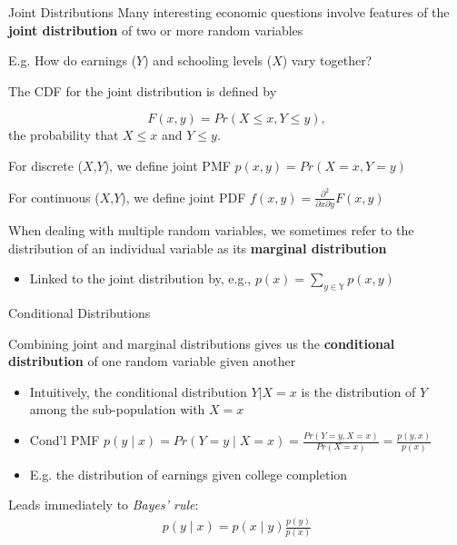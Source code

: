 \documentclass[11pt,english,handout]{beamer}
\newenvironment{wideitemize}{\itemize\addtolength{\itemsep}{10pt}}{\enditemize}
\begin{document}
\begin{frame}{Joint Distributions}
\vspace{0.2cm}
Many interesting economic questions involve features of the \textbf{joint distribution} of two or more random variables

\begin{wideitemize}
\item E.g. How do earnings ($Y$) and schooling levels ($X$) vary together?\pause{}

\item The CDF for the joint distribution is defined by
\vspace{-0.3cm}

$$F(x,y) = Pr(X \leq x, Y \leq y),$$
\noindent the probability that $X \leq x$ and $Y \leq y$.

\pause
\item For discrete ($X$,$Y$), we define joint PMF $p(x,y)=Pr(X=x,Y=y)$

\pause
\item For continuous ($X$,$Y$), we define joint PDF $f(x,y)=\frac{\partial^2}{\partial x \partial y}F(x,y)$
\end{wideitemize}
\vspace{0.5cm}
\pause{}

When dealing with multiple random variables, we sometimes refer to the distribution of an individual variable as its \textbf{marginal distribution}\pause{}

\begin{itemize}
\item Linked to the joint distribution by, e.g., $p(x)=\sum_{y\in\mathbb{Y}}p(x,y)$
\end{itemize}

\end{frame}

\begin{frame}{Conditional Distributions}

Combining joint and marginal distributions gives us the \textbf{conditional distribution} of one random variable given another

\begin{itemize}
\item Intuitively, the conditional distribution $Y|X=x$ is the distribution of $Y$ among the sub-population with $X=x$
	
\item Cond'l PMF $p(y\mid x)=Pr(Y=y\mid X=x)=\frac{Pr(Y=y,X=x)}{Pr(X=x)}=\frac{p(y,x)}{p(x)}$\pause{}
\item E.g. the distribution of earnings given college completion
\end{itemize}
\vspace{0.5cm}\pause{}

Leads immediately to \emph{Bayes' rule}:
\vspace{-0.4cm}
\begin{align*}
p(y\mid x)=p(x\mid y)\frac{p(y)}{p(x)}
\end{align*}

\end{frame}
\end{document}
